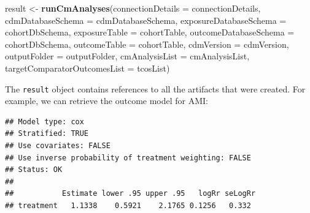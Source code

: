 \documentclass[
  11pt]{book}
\newenvironment{Shaded}{\begin{snugshade}}{\end{snugshade}}
\newcommand{\AttributeTok}[1]{\textcolor[rgb]{0.13,0.29,0.53}{#1}}
\newcommand{\DecValTok}[1]{\textcolor[rgb]{0.00,0.00,0.81}{#1}}
\newcommand{\FunctionTok}[1]{\textcolor[rgb]{0.13,0.29,0.53}{\textbf{#1}}}
\newcommand{\NormalTok}[1]{#1}
\newcommand{\OtherTok}[1]{\textcolor[rgb]{0.56,0.35,0.01}{#1}}
\newcommand{\SpecialCharTok}[1]{\textcolor[rgb]{0.81,0.36,0.00}{\textbf{#1}}}
\theoremstyle{definition}
\theoremstyle{definition}
\theoremstyle{definition}
\theoremstyle{definition}
\theoremstyle{remark}
\begin{document}
\begin{Shaded}
\begin{Highlighting}[]
\NormalTok{result }\OtherTok{\textless{}{-}} \FunctionTok{runCmAnalyses}\NormalTok{(}\AttributeTok{connectionDetails =}\NormalTok{ connectionDetails,}
                        \AttributeTok{cdmDatabaseSchema =}\NormalTok{ cdmDatabaseSchema,}
                        \AttributeTok{exposureDatabaseSchema =}\NormalTok{ cohortDbSchema,}
                        \AttributeTok{exposureTable =}\NormalTok{ cohortTable,}
                        \AttributeTok{outcomeDatabaseSchema =}\NormalTok{ cohortDbSchema,}
                        \AttributeTok{outcomeTable =}\NormalTok{ cohortTable,}
                        \AttributeTok{cdmVersion =}\NormalTok{ cdmVersion,}
                        \AttributeTok{outputFolder =}\NormalTok{ outputFolder,}
                        \AttributeTok{cmAnalysisList =}\NormalTok{ cmAnalysisList,}
                        \AttributeTok{targetComparatorOutcomesList =}\NormalTok{ tcosList)}
\end{Highlighting}
\end{Shaded}

The \texttt{result} object contains references to all the artifacts that were created. For example, we can retrieve the outcome model for AMI:

\begin{Shaded}
\end{Shaded}

\begin{verbatim}
## Model type: cox
## Stratified: TRUE
## Use covariates: FALSE
## Use inverse probability of treatment weighting: FALSE
## Status: OK
## 
##           Estimate lower .95 upper .95   logRr seLogRr
## treatment   1.1338    0.5921    2.1765 0.1256   0.332
\end{verbatim}
\end{document}
